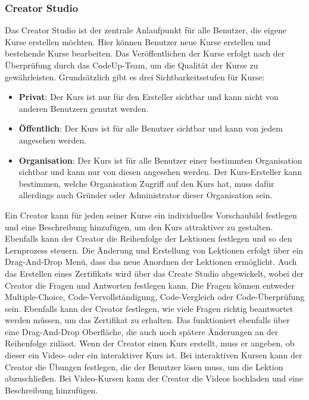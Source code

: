 \documentclass[main.tex]{subfiles}
\begin{document}
    \subsubsection{Creator Studio}
    Das Creator Studio ist der zentrale Anlaufpunkt für alle Benutzer, die eigene Kurse erstellen möchten.
    Hier können Benutzer neue Kurse erstellen und bestehende Kurse bearbeiten.
    Das Veröffentlichen der Kurse erfolgt nach der Überprüfung durch das CodeUp-Team, um die Qualität der Kurse zu gewährleisten.
    Grundsätzlich gibt es drei Sichtbarkeitsstufen für Kurse:
    \begin{itemize}
        \item \textbf{Privat}: Der Kurs ist nur für den Ersteller sichtbar und kann nicht von anderen Benutzern genutzt werden.
        \item \textbf{Öffentlich}: Der Kurs ist für alle Benutzer sichtbar und kann von jedem angesehen werden.
        \item \textbf{Organisation}: Der Kurs ist für alle Benutzer einer bestimmten Organisation sichtbar und kann nur von diesen angesehen werden.
        Der Kurs-Ersteller kann bestimmen, welche Organisation Zugriff auf den Kurs hat, muss dafür allerdings auch Gründer oder Administrator dieser Organisation sein.
    \end{itemize}
    Ein Creator kann für jeden seiner Kurse ein individuelles Vorschaubild festlegen und eine Beschreibung hinzufügen, um den Kurs attraktiver zu gestalten.
    Ebenfalls kann der Creator die Reihenfolge der Lektionen festlegen und so den Lernprozess steuern.
    Die Änderung und Erstellung von Lektionen erfolgt über ein Drag-And-Drop Menü, dass das neue Anordnen der Lektionen ermöglicht.
    Auch das Erstellen eines Zertifikats wird über das Create Studio abgewickelt, wobei der Creator die Fragen und Antworten festlegen kann.
    Die Fragen können entweder Multiple-Choice, Code-Vervollständigung, Code-Vergleich oder Code-Überprüfung sein.
    Ebenfalls kann der Creator festlegen, wie viele Fragen richtig beantwortet werden müssen, um das Zertifikat zu erhalten.
    Das funktioniert ebenfalls über eine Drag-And-Drop Oberfläche, die auch noch spätere Änderungen an der Reihenfolge zulässt.
    Wenn der Creator einen Kurs erstellt, muss er angeben, ob dieser ein Video- oder ein interaktiver Kurs ist.
    Bei interaktiven Kursen kann der Creator die Übungen festlegen, die der Benutzer lösen muss, um die Lektion abzuschließen.
    Bei Video-Kursen kann der Creator die Videos hochladen und eine Beschreibung hinzufügen.
\end{document}
